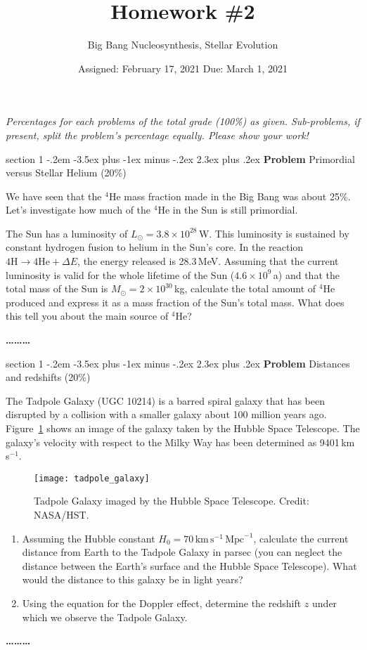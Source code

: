 \documentclass[letterpaper,12pt,twoside=false,DIV=11]{scrartcl}
\makeatletter
\newcommand{\topic}{\author}
\newenvironment{problem}{\@startsection
    {section}
    {1}
    {-.2em}
    {-3.5ex plus -1ex minus -.2ex}
    {2.3ex plus .2ex}
    {
        \pagebreak[3] %
        \noindent\sffamily\bfseries Problem
    }
}
{
    \begin{center}\large\bfseries\ldots\ldots\ldots\end{center}
}
\providecommand{\ex}[1]{\ensuremath{^{#1}}}
\makeatother
\begin{document}
\title{Homework \#2}
\topic{Big Bang Nucleosynthesis, Stellar Evolution}
\date{Assigned: February 17, 2021 \qquad Due: March 1, 2021}

\maketitle
\thispagestyle{fancy}


\noindent\emph{Percentages for each problems of the total grade (100\%) as given. Sub-problems, if present, split the problem's percentage equally. Please show your work!}

\begin{problem}{Primordial versus Stellar Helium (20\%)}

We have seen that the \ex{4}He mass fraction made in the Big Bang was about 25\%. Let's investigate how much of the \ex{4}He in the Sun is still primordial. 

The Sun has a luminosity of $L_\odot = 3.8\times 10^{28}$\,W. This luminosity is sustained by constant hydrogen fusion to helium in the Sun's core. In the reaction $4\mathrm{H} \longrightarrow 4\mathrm{He} + \Delta E$, the energy released is 28.3\,MeV. Assuming that the current luminosity is valid for the whole lifetime of the Sun ($4.6\times 10^{9}$\,a) and that the total mass of the Sun is $M_\odot = 2\times 10^{30}$\,kg, calculate the total amount of \ex{4}He produced and express it as a mass fraction of the Sun's total mass. What does this tell you about the main source of \ex{4}He?

\end{problem}

\begin{problem}{Distances and redshifts (20\%)}

The Tadpole Galaxy (UGC 10214) is a barred spiral galaxy that has been disrupted by a collision with a smaller galaxy about 100 million years ago. Figure~\ref{fig:tadpole_galaxy} shows an image of the galaxy taken by the Hubble Space Telescope. 
The galaxy's velocity with respect to the Milky Way has been determined as 9401\,km\,s$^{-1}$. 
\begin{figure}[tb]
    \centering
    \texttt{[image: tadpole\_galaxy]}
    \caption{Tadpole Galaxy imaged by the Hubble Space Telescope. Credit: NASA/HST.}
    \label{fig:tadpole_galaxy}
\end{figure}

\begin{enumerate}
    \item Assuming the Hubble constant $H_0 = 70\,\mathrm{km}\,\mathrm{s}^{-1}\,\mathrm{Mpc}^{-1}$, calculate the current distance from Earth to the Tadpole Galaxy in parsec (you can neglect the distance between the Earth's surface and the Hubble Space Telescope). What would the distance to this galaxy be in light years?
    \item Using the equation for the Doppler effect, determine the redshift $z$ under which we observe the Tadpole Galaxy.
\end{enumerate}

\end{problem}
\end{document}

